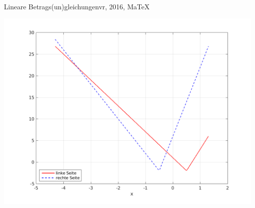 \begin{MAufgabe}{Lineare Betrags(un)gleichungen}{vr, 2016, MaTeX}
 \begin{center}
 \includegraphics[width=0.8\linewidth]{Abb_zur_Ag_autogenerated_ineq_9.png} \end{center}
 
\else\relax\fi
 \end{MAufgabe}